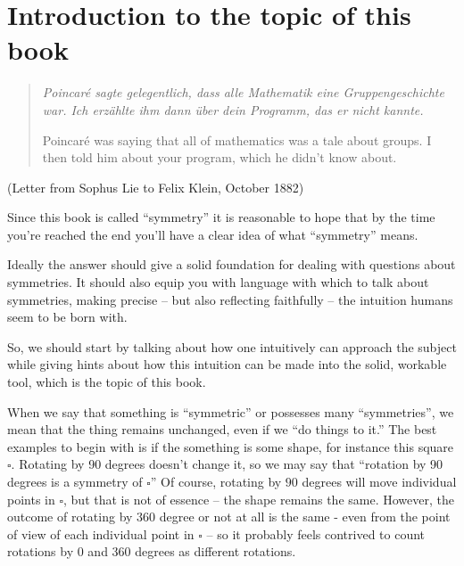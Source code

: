 \chapter{Introduction to the topic of this book}
\label{ch:intro}

\begin{quote}
  \itshape \foreignlanguage{ngerman}{Poincar\'e sagte gelegentlich,
  dass alle Mathematik eine Gruppengeschichte war.
  Ich erz\"ahlte ihm dann \"uber dein Programm,
  das er nicht kannte.}

  \smallskip

  \noindent Poincar\'e was saying
  that all of mathematics was a tale about groups.
  I then told him about your program,
  which he didn't know about.
\end{quote}
\hfill (Letter from Sophus Lie to Felix Klein, October 1882)

\bigskip



Since this book is called ``symmetry'' it is reasonable to hope
that by the time you're reached the end you'll have a clear idea of
what ``symmetry'' means.

Ideally the answer should give a solid foundation for dealing with
questions about symmetries. It should also equip you with language
with which to talk about symmetries, making precise -- but also
reflecting faithfully -- the intuition humans seem to be born with.

So, we should start by talking about how one intuitively can approach the
subject while giving hints about how this intuition can be made into
the solid, workable tool, which is the topic of this book.

When we say that something is ``symmetric'' or possesses many ``symmetries'',
we mean that the thing remains unchanged, even if we ``do things to it.''
The best examples to begin with is if the something is some shape, for
instance this square $\square$. Rotating by 90 degrees doesn’t change it, so we may say that ``rotation by 90 degrees is a symmetry of $\square$''
Of course, rotating by $90$ degrees will move individual points in $\square$, but that
is not of essence -- the shape remains the same.
However, the outcome of rotating by $360$ degree or not at all
is the same - even from the point of view of each individual point in $\square$ -- so it probably feels contrived to count rotations by $0$ and $360$ degrees as different rotations.

